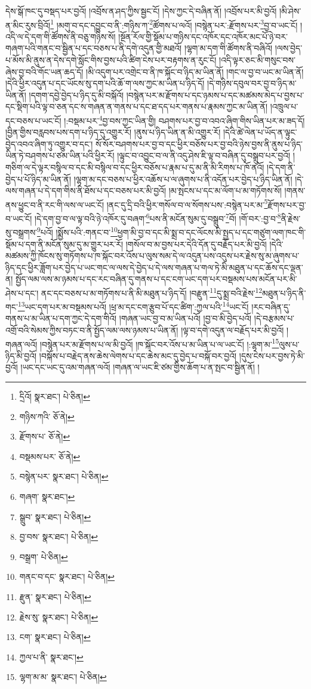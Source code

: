 དེས་སྒོ་ཁང་དུ་བསྡད་པར་བྱའོ། །འབྲོས་ན་ཤད་ཀྱིས་སྦྱང་ངོ། །དེས་ཀྱང་དེ་བཞིན་ནོ། །འབྲོས་པར་མི་བྱའོ། །མི་ཤེས་ན་མིང་རུས་བྲིའོ།\footnote{དྲིའོ།  སྣར་ཐང་།  པེ་ཅིན། } །མགུ་བ་དང་དབྱུང་བ་ནི་:གཉིས་ཀ་\footnote{གཉིས་ཀའི་  ཅོ་ནེ། }ཚོགས་པ་ལའོ། །བསྙེན་པར་:རྫོགས་པར་\footnote{རྫོགས་པ་  ཅོ་ནེ། }བྱ་བ་ཡང་ངོ། །འདི་ལ་དེ་དག་གི་ཚོགས་ནི་བཅུ་གཉིས་སོ། །སྔོན་རོལ་གྱི་སྡོམ་པ་གཉིས་དང་འཁོར་དང་འཁོར་མང་པོ་ཉེ་བར་གཞག་པའི་གནང་བ་སྦྱིན་པ་དང་བཅས་པ་ནི་དགེ་འདུན་གྱི་མཐའོ། །ལྷག་མ་དག་གི་ཚོགས་ནི་བཞིའོ། །ལས་བྱེད་པ་མོས་མི་ནུས་ན་དེས་དགེ་སློང་གིས་བྱས་པའི་ཚིག་ངེས་པར་བརྟགས་ན་རུང་ངོ། །འདི་ལྟར་ཅང་མི་གསུང་བས་ཞེས་བྱ་བའི་གོང་ཡན་ཆད་དོ། །མི་འདུག་པར་འགྲེང་བ་ནི་ཁ་སྐོང་བ་ཉིད་མ་ཡིན་ནོ། །གང་ལ་བྱ་བ་ཡང་མ་ཡིན་ནོ། །དེའི་ཕྱིར་འདུན་པ་དང་ཡོངས་སུ་དག་པའི་ཆོ་ག་ལས་ཀྱང་མ་ཡིན་པ་ཉིད་དོ། །དེ་གཉིས་དབུལ་བར་བྱ་བ་ཉིད་མ་ཡིན་ནོ། །དགག་དབྱེ་བྱེད་པ་ཉིད་དུ་མི་བསྐོའོ། །བསྙེན་པར་མ་རྫོགས་པ་དང་ཉམས་པ་དང་མཚམས་མེད་པ་བྱས་པ་དང་སྡིག་པའི་ལྟ་བ་ཅན་དང་ས་གཞན་ན་གནས་པ་དང་ཐ་དད་པར་གནས་པ་རྣམས་ཀྱང་མ་ཡིན་ནོ། །འཁྲུལ་པ་དང་བཅས་པ་ཡང་ངོ། །:བསྡམ་པར་\footnote{བསྡམས་པར་  ཅོ་ནེ། }བྱ་བས་ཀྱང་ཡིན་གྱི། བཤགས་པར་བྱ་བ་འབའ་ཞིག་གིས་ཡིན་པར་མ་ཟད་དོ། །བྱིན་གྱིས་བརླབས་པས་དག་པ་ཉིད་དུ་འགྱུར་རོ། །ནུས་པ་ཉིད་ཡིན་ན་མི་འགྱུར་རོ། །དེའི་ཚེ་ལེན་པ་ཡོད་ན་ལྟུང་བྱེད་འབའ་ཞིག་ཏུ་འགྱུར་བ་དང་། སོ་སོར་བཤགས་པར་བྱ་བ་དང་ཕྱིར་བཅོས་པར་བྱ་བའི་ཉེས་བྱས་ནི་ནུས་པ་ཉིད་ཡིན་ཏེ་བཤགས་པ་ཙམ་ཡིན་པའི་ཕྱིར་རོ། །ལྟུང་བ་འབྱུང་བ་ལ་ནི་འདུ་ཤེས་ཇི་ལྟ་བ་བཞིན་དུ་བསྒྲུབ་པར་བྱའོ། །གཅིག་ལ་དེ་ལྟར་བསྙིལ་བ་དང་མི་བསྙིལ་བ་དང་ཕྱིར་བཅོས་པ་རྣམ་པ་དུ་མ་ནི་མི་རིགས་པ་ཁོ་ནའོ། །དེ་དག་ནི་བྱེད་པ་པོ་ཉིད་མ་ཡིན་ནོ། །ལྷག་མ་དང་བཅས་པ་ཕྱིར་འཆོས་པ་ལ་ཞུགས་པ་ནི་འདོན་པར་བྱེད་པ་ཉིད་ཡིན་ནོ། །དེ་ལས་གཞན་པ་དེ་དག་གིས་ནི་ཐོས་པ་དང་བཅས་པར་མི་བྱའོ། །མ་སྤངས་པ་དང་མ་ལོག་པ་མ་གཏོགས་སོ། །གནས་ནས་ཕྱུང་བ་ནི་རང་གི་ལས་ལ་ཡང་ངོ། །ནང་དུ་དྲི་བའི་ཕྱིར་གསོལ་བ་ལ་སོགས་པས་:བསྙེན་པར་མ་\footnote{བསྙེན་པར་  སྣར་ཐང་།  པེ་ཅིན། }རྫོགས་པར་བྱ་བ་ཡང་ངོ། །དེ་དག་བྱ་བ་ལ་ལྟ་བའི་ཉེ་འཁོར་དུ་བཞག་\footnote{གཞག་  སྣར་ཐང་། }པས་ནི་མངོན་སུམ་དུ་བསྒྲུབ་\footnote{སྒྲུབ་  སྣར་ཐང་།  པེ་ཅིན། }བོ། །གོ་བར་:བྱ་བ་\footnote{བྱ་བས་  སྣར་ཐང་།  པེ་ཅིན། }ནི་རྗེས་སུ་བསྒྲགས་\footnote{བསྒྲག་  པེ་ཅིན། }པའོ། །སྨྱོས་པའི་:གནང་བ་\footnote{གནང་བ་དང་  སྣར་ཐང་།  པེ་ཅིན། }ཕྱག་མི་བྱ་བ་དང་མི་སྨྲ་བ་དང་ལོངས་མི་སྤྱད་པ་དང་གཙུག་ལག་ཁང་གི་སྡོམ་པ་དག་ནི་མངོན་སུམ་དུ་མ་གྱུར་པར་རོ། །གསོལ་བ་མ་བྱས་པར་དེའི་དོན་དུ་བརྗོད་པར་མི་བྱའོ། །དེའི་མཚམས་ཀྱི་ཁོངས་སུ་གཏོགས་པ་ཁ་སྐོང་བར་འོས་པ་ལུས་སམ་དེ་ལ་འདུན་པས་འདུས་པར་རྗེས་སུ་མ་ཞུགས་པ་ཉིད་དང་ཕྱིར་ཟློག་པར་བྱེད་པ་ཡང་གང་ལ་ལས་དེ་བྱེད་པ་དེ་ལས་གཞན་པ་གལ་ཏེ་མི་མཐུན་པ་དང་ཆོས་དང་ལྡན་ན། སྤྱོད་ལམ་ལས་མ་ཉམས་པ་དང་རང་བཞིན་དུ་གནས་པ་དང་ངག་ཡང་དག་པར་བསྡམས་པས་མངོན་པར་མི་ཤེས་པ་དང་། ནང་དང་བཅས་པ་མ་གཏོགས་པ་ནི་མི་མཐུན་པ་ཉིད་དོ། །བརྫུན་\footnote{རྫུན་  སྣར་ཐང་།  པེ་ཅིན། }དུ་སྨྲ་བའི་རྗེས་\footnote{རྗེས་སུ་  སྣར་ཐང་།  པེ་ཅིན། }མཐུན་པ་ཉིད་ནི་གང་\footnote{ངག་  སྣར་ཐང་།  པེ་ཅིན། }ཡང་དག་པར་མ་བསྡམས་པའོ། །ཕྲ་མ་དང་ངག་རྩུབ་པོ་དང་ཚིག་:ཀྱལ་པའི་\footnote{ཀྱལ་པ་ནི་  སྣར་ཐང་། }ཡང་ངོ། །རང་བཞིན་དུ་གནས་པ་མ་ཡིན་པ་དག་ཀྱང་དེ་དག་གིའོ། །གཞན་ཡང་བྱ་བ་མ་ཡིན་པའོ། །བྱ་བ་མི་བྱེད་པའོ། །དེ་བརྩམས་པ་འགྲོ་བའི་སེམས་ཀྱིས་བཏང་བ་ནི་སྤྱོད་ལམ་ལས་ཉམས་པ་ཡིན་ནོ། །ལྟ་བ་དགེ་འདུན་ལ་བརྗོད་པར་མི་བྱའོ། །གཞན་ལའོ། །བསྙེན་པར་མ་རྫོགས་པ་ལ་མི་བྱའོ། །ཁ་སྐོང་བར་འོས་པ་མ་ཡིན་པ་ལ་ཡང་ངོ། །:ལྷག་མ་\footnote{ལྷག་མ་མ་  སྣར་ཐང་།  པེ་ཅིན། }ལུས་པ་ཉིད་མི་བྱའོ། །བསྐོས་པ་བརྗེད་ནས་ཆེས་ལེགས་པ་དང་ཆེས་མང་དུ་བྱེད་པ་བསྐོ་བར་བྱའོ། །དུས་ངེས་པར་བྱས་ཏེ་མི་བྱའོ། །ཡང་དང་ཡང་དུ་འམ་གཞན་ལའོ། །གཞན་ལ་ཡང་ཇི་ཙམ་གྱིས་ཆོག་པ་ན་སྤང་བ་སྦྱིན་ནོ། །
